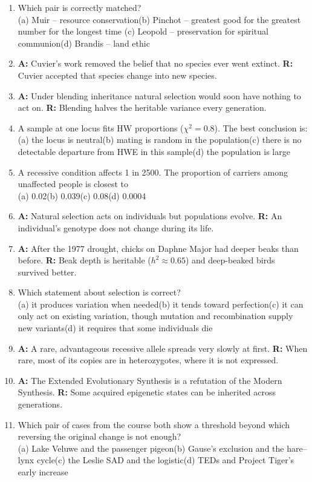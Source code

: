 \begin{enumerate}[label=\textbf{Q\arabic*.},leftmargin=2.6em]
finding food made per-capita success fall at low numbers.
\item Which pair is correctly matched?\\
(a) Muir -- resource conservation\quad (b) Pinchot -- greatest good for the greatest number for the longest time\quad
(c) Leopold -- preservation for spiritual communion\quad (d) Brandis -- land ethic
\item \textbf{A:} Cuvier's work removed the belief that no species ever went extinct. \textbf{R:} Cuvier accepted that species
change into new species.
\item \textbf{A:} Under blending inheritance natural selection would soon have nothing to act on. \textbf{R:} Blending halves the
heritable variance every generation.
\item A sample at one locus fits HW proportions ($\chi^2=0.8$). The best conclusion is:\\
(a) the locus is neutral\quad (b) mating is random in the population\quad (c) there is no detectable departure from HWE in
this sample\quad (d) the population is large
\item A recessive condition affects 1 in 2500. The proportion of carriers among unaffected people is closest to\\
(a) 0.02\quad (b) 0.039\quad (c) 0.08\quad (d) 0.0004
\item \textbf{A:} Natural selection acts on individuals but populations evolve. \textbf{R:} An individual's genotype does not change
during its life.
\item \textbf{A:} After the 1977 drought, chicks on Daphne Major had deeper beaks than before. \textbf{R:} Beak depth is
heritable ($h^2\approx0.65$) and deep-beaked birds survived better.
\item Which statement about selection is correct?\\
(a) it produces variation when needed\quad (b) it tends toward perfection\quad (c) it can only act on existing variation, though
mutation and recombination supply new variants\quad (d) it requires that some individuals die
\item \textbf{A:} A rare, advantageous recessive allele spreads very slowly at first. \textbf{R:} When rare, most of its copies
are in heterozygotes, where it is not expressed.
\item \textbf{A:} The Extended Evolutionary Synthesis is a refutation of the Modern Synthesis. \textbf{R:} Some acquired
epigenetic states can be inherited across generations.
\item Which pair of cases from the course both show a threshold beyond which reversing the original change is not enough?\\
(a) Lake Veluwe and the passenger pigeon\quad (b) Gause's exclusion and the hare--lynx cycle\quad (c) the Leslie SAD and
the logistic\quad (d) TEDs and Project Tiger's early increase
\end{enumerate}

